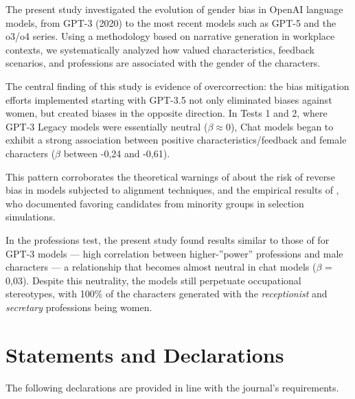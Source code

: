 \documentclass[12pt,a4paper]{article}
\begin{document}
The present study investigated the evolution of gender bias in OpenAI
language models, from GPT-3 (2020) to the most recent models
such as GPT-5 and the o3/o4 series. Using a methodology based on
narrative generation in workplace contexts, we systematically analyzed
how valued characteristics, feedback scenarios,
and professions are associated with the gender of the characters.

The central finding of this study is evidence of overcorrection: the
bias mitigation efforts implemented starting with GPT-3.5 not
only eliminated biases against women, but created biases in the opposite
direction. In Tests 1 and 2, where GPT-3 Legacy models were essentially
neutral ($\beta \approx 0$), Chat models began to exhibit a strong association
between positive characteristics/feedback and female characters ($\beta$
between -0,24 and -0,61).

This pattern corroborates the theoretical warnings of \citet{liu2025} about the
risk of reverse bias in models subjected to alignment techniques, and
the empirical results of \citet{karvonen2025}, who documented
favoring candidates from minority groups in selection
simulations.

In the professions test, the present study found results similar
to those of \citet{lucy2021} for GPT-3 models --- high correlation between
higher-''power'' professions and male characters --- a relationship that
becomes almost neutral in chat models ($\beta$ = 0,03). Despite this
neutrality, the models still perpetuate occupational stereotypes, with
100\% of the characters generated with the \textit{receptionist} and
\textit{secretary} professions being women.





\newpage

\section*{Statements and Declarations}

\noindent The following declarations are provided in line with the journal's requirements.
\end{document}
